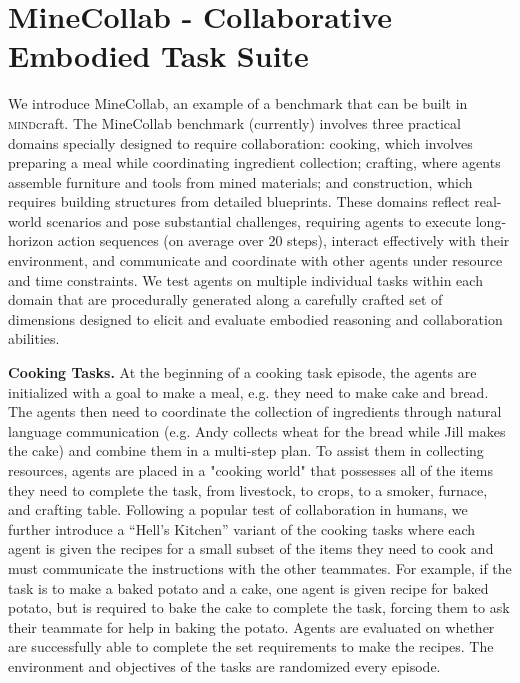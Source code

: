 \documentclass{article}
\newcommand{\mindcraft}{\textsc{mind}craft}
\begin{document}
\section{MineCollab - Collaborative Embodied Task Suite} \label{sec: tasks}

We introduce MineCollab, an example of a benchmark that can be built in \mindcraft{}.
The MineCollab benchmark (currently) involves three practical domains specially designed to require collaboration: cooking, which involves preparing a meal while coordinating ingredient collection; crafting, where agents assemble furniture and tools from mined materials; and construction, which requires building structures from detailed blueprints.
These domains reflect real-world scenarios and pose substantial challenges, requiring agents to execute long-horizon action sequences (on average over 20 steps), interact effectively with their environment, and communicate and coordinate with other agents under resource and time constraints.
We test agents on multiple individual tasks within each domain that are procedurally generated along a carefully crafted set of dimensions designed to elicit and evaluate embodied reasoning and collaboration abilities.



\textbf{Cooking Tasks.}
At the beginning of a cooking task episode, the agents are initialized with a goal to make a meal, e.g. they need to make cake and bread.
The agents then need to coordinate the collection of ingredients through natural language communication (e.g. Andy collects wheat for the bread while Jill makes the cake) and combine them in a multi-step plan. 
To assist them in collecting resources, agents are placed in a "cooking world" that possesses all of the items they need to complete the task, from livestock, to crops, to a smoker, furnace, and crafting table.
Following a popular test of collaboration in humans, we further introduce a ``Hell's Kitchen'' variant of the cooking tasks where each agent is given the recipes for a small subset of the items they need to cook and must communicate the instructions with the other teammates.
For example, if the task is to make a baked potato and a cake, one agent is given recipe for baked potato, but is required to bake the cake to complete the task, forcing them to ask their teammate for help in baking the potato.
Agents are evaluated on whether are successfully able to complete the set requirements to make the recipes.
The environment and objectives of the tasks are randomized every episode.
\end{document}
